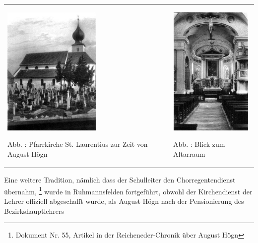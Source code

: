 \begin{center}
\begin{minipage}{9.491cm}
\begin{flushleft}
\tablefirsthead{}
\tablehead{}
\tabletail{}
\tablelasttail{}
\begin{supertabular}{m{4.8960004cm}m{4.196cm}}

\includegraphics[width=4.713cm,height=6.301cm]{pictures/zulassungsarbeit-img025.jpg}

Abb. : Pfarrkirche St. Laurentius zur Zeit von
August Högn &

\includegraphics[width=4.013cm,height=6.292cm]{pictures/zulassungsarbeit-img026.jpg}

Abb. : Blick zum Altarraum\\
\end{supertabular}
\end{flushleft}
\end{minipage}
\end{center}
Eine weitere Tradition, nämlich dass der Schulleiter den
Chorregentendienst übernahm, \footnote{Dokument Nr. 55, Artikel in der
Reicheneder-Chronik über August Högn} wurde in Ruhmannsfelden
fortgeführt, obwohl der Kirchendienst der Lehrer offiziell abgeschafft
wurde, als August Högn nach der Pensionierung des Bezirkshauptlehrers
